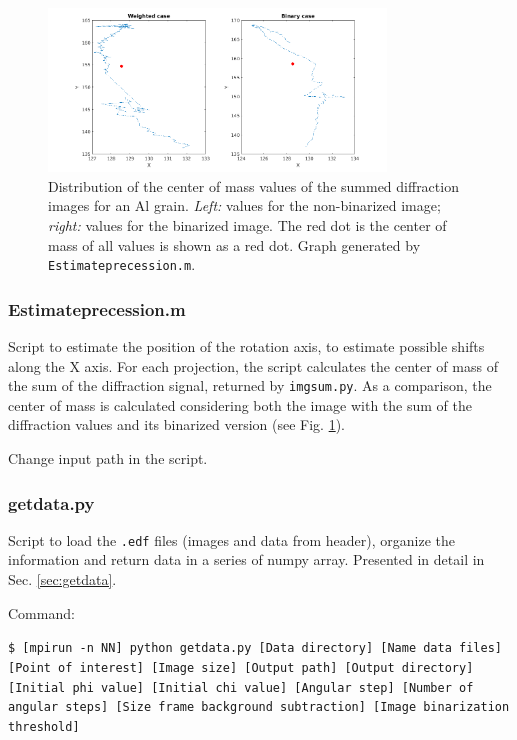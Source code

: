 \documentclass[11pt]{scrartcl}
\begin{document}
\begin{figure}[h]
    \centering
    \includegraphics[width=0.8\textwidth]{Estimate_CM.png}
    \caption{Distribution of the center of mass values of the summed diffraction images for an Al grain. {\emph{Left:}} values for the non-binarized image; {\emph{right:}} values for the binarized image. The red dot is the center of mass of all values is shown as a red dot. Graph generated by {\texttt{Estimate\textunderscore precession.m}}.}
    \label{fig:estimate_CM}
\end{figure}

\subsubsection{Estimate\textunderscore precession.m}

Script to estimate the position of the rotation axis, to estimate possible shifts along the {\footnotesize{X}} axis. For each projection, the script calculates the center of mass of the sum of the diffraction signal, returned by {\texttt{img\textunderscore sum.py}}. As a comparison, the center of mass is calculated considering both the image with the sum of the diffraction values and its binarized version (see Fig. \ref{fig:estimate_CM}).

Change input path in the script.

\subsubsection{getdata.py}

Script to load the {\texttt{.edf}} files (images and data from header), organize the information and return data in a series of numpy array. Presented in detail in Sec. \ref{sec:getdata}. 

Command:

{\texttt{\$ [mpirun -n NN] python getdata.py [Data directory] [Name data files] [Point of interest] [Image size] [Output path] [Output directory] [Initial phi value] [Initial chi value] [Angular step] [Number of angular steps] [Size frame background subtraction] [Image binarization threshold]}}
\end{document}

